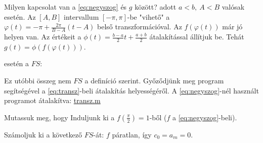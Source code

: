 \begin{spacing}{1.3}
 Milyen kapcsolat van a \eqref{eq:negyszog} és $g$ között? 
adott $a<b,\ A<B$ valósak esetén.
\newline{} Az $[A,B]$ intervallum $[-\pi,\pi]$-be "vihető" 
a $\varphi(t)=-\pi+\frac{2\pi}{B-A}(t-A)$ belső transzformációval. Az $f(\varphi(t))$ 
már jó helyen van. Az értékeit a $\phi(t)=\frac{b-a}{2}t+\frac{a+b}{2}$ átalakítással 
állítjuk be. Tehát $g(t)=\phi(f(\varphi(t)))$.

\vspace{0.5cm}
esetén a $FS$:

 Ez utóbbi összeg nem $FS$ a definíció szerint.
\newline
{} Győződjünk meg program segítségével a \eqref{eq:transz}-beli átalakítás 
helyességéről.
 A \eqref{eq:negyszog}-nél használt programot átalakítva:
\href{M/transz.m}{transz.m}



 Mutassuk meg, hogy 
 Induljunk ki a $f(\frac{\pi}{2})=1$-ből ($f$ a \eqref{eq:negyszog}-beli). 


\vspace{0.2cm}
 Számoljuk ki a következő \fv{}$FS$-át:
$f$ páratlan, így $c_{0}=a_{m}=0$. 



\end{spacing}

